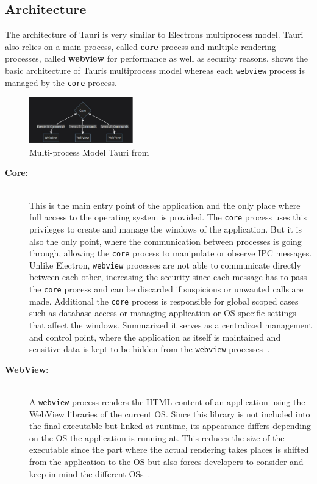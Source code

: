 \subsection{Architecture}
\label{subsec:tauri:architecture}
The architecture of Tauri is very similar to Electrons multiprocess model.
Tauri also relies on a main process, called \textbf{core} process and multiple rendering processes, called \textbf{webview} for performance as well as security reasons.
 shows the basic architecture of Tauris multiprocess model whereas each \texttt{webview} process is managed by the \texttt{core} process.
\begin{figure}[ht]
    \centering
    \includegraphics[width=0.4\textwidth]{images/TauriArchitecture}
    \caption{Multi-process Model Tauri from~\cite{tauri}}
    \label{fig:tauri:model}
\end{figure}

\begin{description}
    \item[\textbf{Core}:] \hfill \\ This is the main entry point of the application and the only place where full access to the operating system is provided.
    The \texttt{core} process uses this privileges to create and manage the windows of the application.
    But it is also the only point, where the communication between processes is going through, allowing the \texttt{core} process to manipulate or observe \ac{IPC} messages.
    Unlike Electron, \texttt{webview} processes are not able to communicate directly between each other, increasing the security since each message has to pass the \texttt{core} process and
    can be discarded if suspicious or unwanted calls are made.
    Additional the \texttt{core} process is responsible for global scoped cases such as database access or managing application or \ac{OS}-specific settings that affect the windows.
    Summarized it serves as a centralized management and control point, where the application as itself is maintained and sensitive data is kept to be hidden from the \texttt{webview} processes~\cite{tauri}.


    \item[\textbf{WebView}:] \hfill \\ A \texttt{webview} process renders the \ac{HTML} content of an application using the WebView libraries of the current \ac{OS}.
    Since this library is not included into the final executable but linked at runtime, its appearance differs depending on the \ac{OS} the application is running at.
    This reduces the size of the executable since the part where the actual rendering takes places is shifted from the application to the \ac{OS} but also forces
    developers to consider and keep in mind the different \ac{OS}s~\cite{tauri}.

\end{description}

